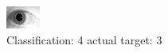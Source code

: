 \begin{figure}[h!]
\begin{center}
\includegraphics[width=0.60\columnwidth]{figures/ID1813_class_4_target_3.png}
\end{center}
\caption{ Classification: 4 actual target: 3}
\label{fig:ID1813_class_4_target_3}
\end{figure}
